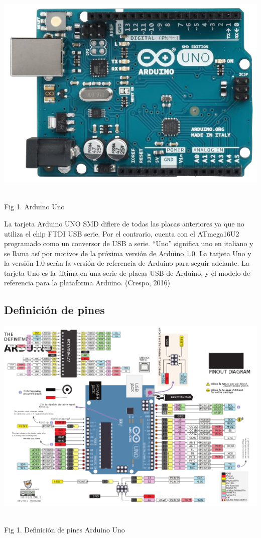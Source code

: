 \documentclass[12pt]{report}
\begin{document}
\begin{center}
\includegraphics[scale=0.3]{Documento/Figuras/fig1.png}
\begin{scriptsize}\\ 
Fig 1. Arduino Uno
\end{scriptsize}
\end{center}

La tarjeta Arduino UNO SMD difiere de todas las placas anteriores ya que no utiliza el chip FTDI USB serie. Por el contrario, cuenta con el ATmega16U2 programado como un conversor de USB a serie.  “Uno” significa uno en italiano y se llama así por motivos de la próxima versión de Arduino 1.0. La tarjeta Uno y la versión 1.0 serán la versión de referencia de Arduino para seguir adelante. La tarjeta Uno es la última en una serie de placas USB de Arduino, y el modelo de referencia para la plataforma Arduino. (Crespo, 2016)

\subsection{Definición de pines}
\begin{center}
\includegraphics[scale=0.38]{Documento/Figuras/fig2.png}
\begin{scriptsize}\\ 
Fig 1. Definición de pines Arduino Uno
\end{scriptsize}
\end{center}
\end{document}
